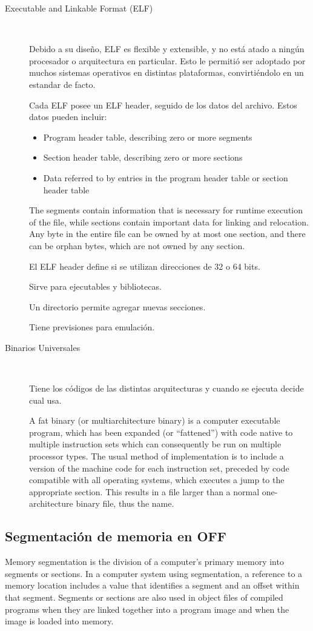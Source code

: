 \documentclass[a4paper, twoside]{article}
\begin{document}
\begin{description}
	\item[Executable and Linkable Format (ELF)] ~
	
	Debido a su diseño, ELF es flexible y extensible, y no está atado a ningún procesador o arquitectura en particular. Esto le permitió ser adoptado por muchos sistemas operativos en distintas plataformas, convirtiéndolo en un estandar de facto.

	Cada ELF posee un ELF header, seguido de los datos del archivo. Estos datos pueden incluir:
	\begin{itemize}
		\item Program header table, describing zero or more segments
		\item Section header table, describing zero or more sections
		\item Data referred to by entries in the program header table or section header table
	\end{itemize}

	The segments contain information that is necessary for runtime execution of the file, while sections contain important data for linking and relocation. Any byte in the entire file can be owned by at most one section, and there can be orphan bytes, which are not owned by any section.

	El ELF header define si se utilizan direcciones de 32 o 64 bits.

	Sirve para ejecutables y bibliotecas.

	Un directorio permite agregar nuevas secciones.

	Tiene previsiones para emulación.

	\item[Binarios Universales] ~

	Tiene los códigos de las distintas arquitecturas y cuando se ejecuta decide cual usa.

	A fat binary (or multiarchitecture binary) is a computer executable program, which has been expanded (or ``fattened'') with code native to multiple instruction sets which can consequently be run on multiple processor types. The usual method of implementation is to include a version of the machine code for each instruction set, preceded by code compatible with all operating systems, which executes a jump to the appropriate section. This results in a file larger than a normal one-architecture binary file, thus the name.
\end{description}

\subsection{Segmentación de memoria en OFF}
Memory segmentation is the division of a computer's primary memory into segments or sections. In a computer system using segmentation, a reference to a memory location includes a value that identifies a segment and an offset within that segment. Segments or sections are also used in object files of compiled programs when they are linked together into a program image and when the image is loaded into memory.
\end{document}
